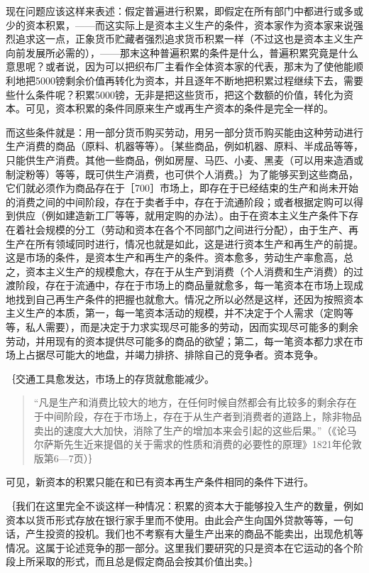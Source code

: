 现在问题应该这样来表述：假定普遍进行积累，即假定在所有部门中都进行或多或少的资本积累，——而这实际上是资本主义生产的条件，资本家作为资本家来说强烈追求这一点，正象货币贮藏者强烈追求货币积累一样（不过这也是资本主义生产向前发展所必需的），——那末这种普遍积累的条件是什么，普遍积累究竟是什么意思呢？或者说，因为可以把织布厂主看作全体资本家的代表，那末为了使他能顺利地把5000镑剩余价值再转化为资本，并且逐年不断地把积累过程继续下去，需要些什么条件呢？积累5000镑，无非是把这些货币，把这个数额的价值，转化为资本。可见，资本积累的条件同原来生产或再生产资本的条件是完全一样的。

而这些条件就是：用一部分货币购买劳动，用另一部分货币购买能由这种劳动进行生产消费的商品（原料、机器等等）。｛某些商品，例如机器、原料、半成品等等，只能供生产消费。其他一些商品，例如房屋、马匹、小麦、黑麦（可以用来造酒或制淀粉等）等等，既可供生产消费，也可供个人消费。｝为了能够买到这些商品，它们就必须作为商品存在于［700］市场上，即存在于已经结束的生产和尚未开始的消费之间的中间阶段，存在于卖者手中，存在于流通阶段；或者根据定购可以得到供应（例如建造新工厂等等，就用定购的办法）。由于在资本主义生产条件下存在着社会规模的分工（劳动和资本在各个不同部门之间进行分配），由于生产、再生产在所有领域同时进行，情况也就是如此，这是进行资本生产和再生产的前提。这是市场的条件，是资本生产和再生产的条件。资本愈多，劳动生产率愈高，总之，资本主义生产的规模愈大，存在于从生产到消费（个人消费和生产消费）的过渡阶段，存在于流通中，存在于市场上的商品量就愈多，每一笔资本在市场上现成地找到自己再生产条件的把握也就愈大。情况之所以必然是这样，还因为按照资本主义生产的本质，第一，每一笔资本活动的规模，并不决定于个人需求（定购等等，私人需要），而是决定于力求实现尽可能多的劳动，因而实现尽可能多的剩余劳动，并用现有的资本提供尽可能多的商品的欲望；第二，每一笔资本都力求在市场上占据尽可能大的地盘，并竭力排挤、排除自己的竞争者。资本竞争。

｛交通工具愈发达，市场上的存货就愈能减少。

\begin{quote}{“凡是生产和消费比较大的地方，在任何时候自然都会有比较多的剩余存在于中间阶段，存在于市场上，存在于从生产者到消费者的道路上，除非物品卖出的速度大大加快，消除了生产的增加本来会引起的这些后果。”（《论马尔萨斯先生近来提倡的关于需求的性质和消费的必要性的原理》1821年伦敦版第6—7页）｝}\end{quote}

可见，新资本的积累只能在和已有资本再生产条件相同的条件下进行。

｛我们在这里完全不谈这样一种情况：积累的资本大于能够投入生产的数量，例如资本以货币形式存放在银行家手里而不使用。由此会产生向国外贷款等等，一句话，产生投资的投机。我们也不考察有大量生产出来的商品不能卖出，出现危机等情况。这属于论述竞争的那一部分。这里我们要研究的只是资本在它运动的各个阶段上所采取的形式，而且总是假定商品会按其价值出卖。｝

